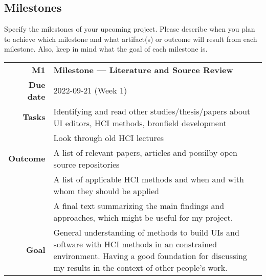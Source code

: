 \subsection{Milestones}
\label{subsec:milestone}
Specify the milestones of your upcoming project. Please describe when you plan to achieve which milestone and what artifact(s) or outcome will result from each milestone. Also, keep in mind what the goal of each milestone is.


\begin{table}[htbp]
\small
\colorbox{usethiscolorhere}{
\centering
\begin{tabularx}{\textwidth}{@{} r Y @{}}
	\textbf{M1}
	& \textbf{Milestone --- Literature and Source Review}\vspace{2mm}\\
	\textbf{Due date} & 2022-09-21 (Week $1$)\vspace{2mm}\\
     \textbf{Tasks} & Identifying and read other studies/thesis/papers about UI editors, HCI methods, bronfield development\\&Look through old HCI lectures\vspace{2mm}\\
    \textbf{Outcome} & A list of relevant papers, articles and possilby open source repositories\\
    & A list of applicable HCI methods and when and with whom they should be applied\\
    & A final text summarizing the main findings and approaches, which might be useful for my project. \vspace{2mm}\\
    \textbf{Goal} & General understanding of methods to build UIs and software with HCI methods in an constrained environment. Having a good foundation for discussing my results in the context of other people's work.\vspace{2mm}\\
    
\end{tabularx}
}
\end{table}

